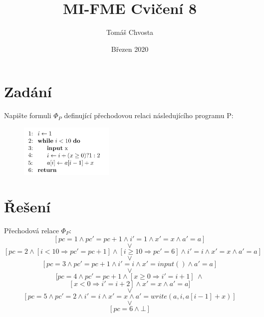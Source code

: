 \documentclass{article}
\title{MI-FME Cvičení 8}
\author{Tomáš Chvosta}
\date{Březen 2020}
\begin{document}
\maketitle

\section{Zadání}
Napište formuli $\Phi_P$ definující přechodovou relaci následujícího programu P:
\begin{figure}[H]
    \centering
    \includegraphics[width=0.4\textwidth]{code.png}
\end{figure}

\section{Řešení}

Přechodová relace $\Phi_P$:
$$[pc=1 \wedge pc' = pc + 1 \wedge i' = 1 \wedge x' = x \wedge a' = a ]$$
$$\lor$$
$$[pc=2 \wedge [i<10 \Rightarrow pc' = pc + 1] \wedge [i \geq 10 \Rightarrow pc' = 6] \wedge i' = i \wedge x' = x \wedge a' = a]$$
$$\lor$$
$$[pc = 3 \wedge pc' = pc + 1 \wedge i' = i \wedge x' = input() \wedge a' = a ]$$
$$\lor$$
$$[pc = 4 \wedge pc' = pc + 1 \wedge [x \geq 0 \Rightarrow i' = i + 1] \ \wedge$$
$$ [x < 0 \Rightarrow i' = i + 2] \wedge x' = x \wedge a' = a ]$$
$$\lor$$
$$[pc = 5 \wedge pc' = 2 \wedge i' = i \wedge x' = x \wedge a' = write(a, i, a[i-1] + x) ]$$
$$\lor$$
$$[pc = 6 \wedge \bot]$$
\end{document}
